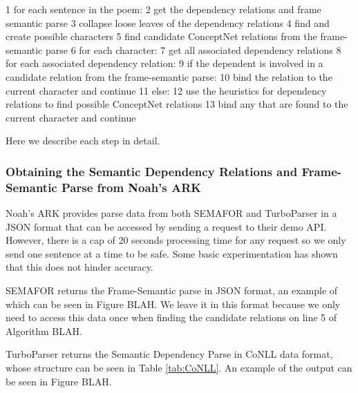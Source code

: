 1 for each sentence in the poem:
2   get the dependency relations and frame semantic parse
3	collapse loose leaves of the dependency relations
4	find and create possible characters
5	find candidate ConceptNet relations from the frame-semantic parse
6	for each character:
7		get all associated dependency relations
8		for each associated dependency relation:
9			if the dependent is involved in a candidate relation from the frame-semantic parse:
10				bind the relation to the current character and continue
11			else:
12				use the heuristics for dependency relations to find possible ConceptNet relations
13				bind any that are found to the current character and continue
				
Here we describe each step in detail.

\subsubsection{Obtaining the Semantic Dependency Relations and Frame-Semantic Parse from Noah's ARK}

Noah's ARK provides parse data from both SEMAFOR and TurboParser in a JSON format that can be accessed by sending a request to their demo API. However, there is a cap of 20 seconds processing time for any request so we only send one sentence at a time to be safe. Some basic experimentation has shown that this does not hinder accuracy.

SEMAFOR returns the Frame-Semantic parse in JSON format, an example of which can be seen in Figure BLAH. We leave it in this format because we only need to access this data once when finding the candidate relations on line 5 of Algorithm BLAH.

TurboParser returns the Semantic Dependency Parse in CoNLL data format, whose structure can be seen in Table \ref{tab:CoNLL}. An example of the output can be seen in Figure BLAH.

